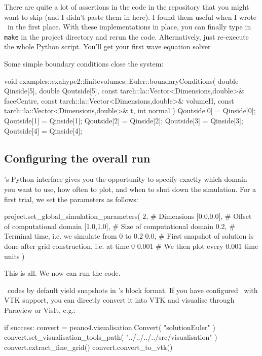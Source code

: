 \noindent
There are quite a lot of assertions in the code in the repository that you might
want to skip (and I didn't paste them in here).
I found them useful when I wrote \ExaHyPE\ in the first place.
With these implementations in place, you can finally type in \texttt{make} in
the project directory and rerun the code.
Alternatively, just re-execute the whole Python script.
You'll get your first wave equation solver

Some simple boundary conditions close the system:

\begin{code}
void examples::exahype2::finitevolumes::Euler::boundaryConditions(
  double                                       Qinside[5],
  double                                       Qoutside[5],
  const tarch::la::Vector<Dimensions,double>&  faceCentre,
  const tarch::la::Vector<Dimensions,double>&  volumeH,
  const tarch::la::Vector<Dimensions,double>&  t,
  int                                          normal
) {
  Qoutside[0] = Qinside[0];
  Qoutside[1] = Qinside[1];
  Qoutside[2] = Qinside[2];
  Qoutside[3] = Qinside[3];
  Qoutside[4] = Qinside[4];
}
\end{code}



\subsection{Configuring the overall run}

\ExaHyPE's Python interface gives you the opportunity to specify exactly which
domain you want to use, how often to plot, and when to shut down the simulation.
For a first trial, we set the parameters as follows:
\begin{code}
project.set_global_simulation_parameters(
  2,         # Dimensions
  [0.0,0.0], # Offset of computational domain
  [1.0,1.0], # Size of computational domain
  0.2,       # Terminal time, i.e. we simulate from 0 to 0.2
  0.0,       # First snapshot of solution is done after grid construction, i.e. at time 0
  0.001      # We then plot every 0.001 time units
)
\end{code}
\noindent
This is all. We now can run the code.



\ExaHyPE\ codes by default yield snapshots in \Peano's block format. 
If you have configured \Peano\ with VTK support, you can directly convert it
into VTK and visualise through Paraview or VisIt, e.g.:
\begin{code}
if success:
  convert = peano4.visualisation.Convert( "solutionEuler" )
  convert.set_visualisation_tools_path( "../../../../src/visualisation" )
  convert.extract_fine_grid()
  convert.convert_to_vtk()
\end{code}


